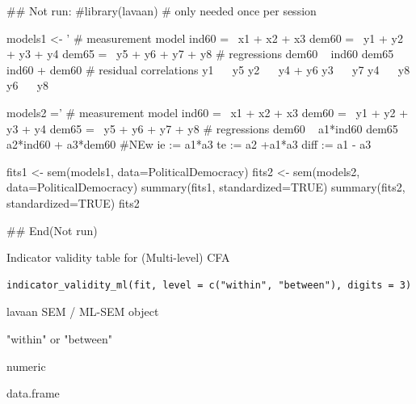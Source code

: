\documentclass[a4paper]{book}
\begin{document}
\begin{Examples}
\begin{ExampleCode}

\#\# Not run: 
#library(lavaan) # only needed once per session

models1 <- '
  # measurement model
    ind60 =~ x1 + x2 + x3
    dem60 =~ y1 + y2 + y3 + y4
    dem65 =~ y5 + y6 + y7 + y8
    # regressions
    dem60 ~ ind60
    dem65 ~ ind60 + dem60
      # residual correlations
    y1 ~~ y5
    y2 ~~ y4 + y6
    y3 ~~ y7
    y4 ~~ y8
    y6 ~~ y8

models2 ='
  # measurement model
    ind60 =~ x1 + x2 + x3
    dem60 =~ y1 + y2 + y3 + y4
    dem65 =~ y5 + y6 + y7 + y8
     # regressions
    dem60 ~ a1*ind60
    dem65 ~ a2*ind60 + a3*dem60
 #NEw
   ie := a1*a3
   te := a2 +a1*a3
   diff := a1 - a3




fits1 <- sem(models1, data=PoliticalDemocracy)
fits2 <- sem(models2, data=PoliticalDemocracy)
summary(fits1, standardized=TRUE)
summary(fits2, standardized=TRUE)
fits2 %

## End(Not run)

\end{ExampleCode}
\end{Examples}
%
\begin{Description}
Indicator validity table for (Multi-level) CFA
\end{Description}
%
\begin{Usage}
\begin{verbatim}
indicator_validity_ml(fit, level = c("within", "between"), digits = 3)
\end{verbatim}
\end{Usage}
%
\begin{Arguments}
\begin{ldescription}
\item[\code{fit}] lavaan SEM / ML-SEM object

\item[\code{level}] "within" or "between"

\item[\code{digits}] numeric
\end{ldescription}
\end{Arguments}
%
\begin{Value}
data.frame
\end{Value}
\end{document}
